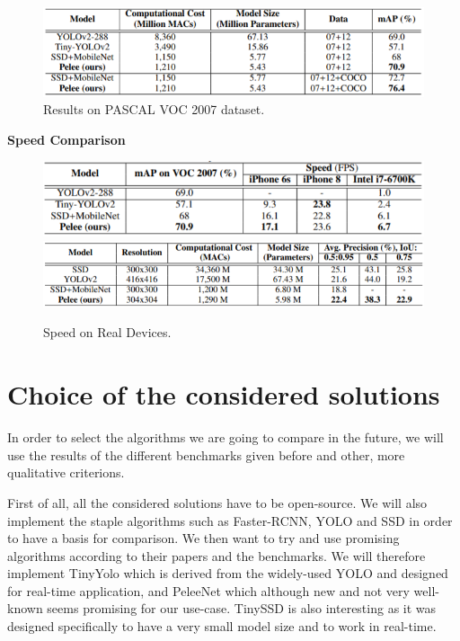 \documentclass[10pt]{article}
\begin{document}
\begin{figure}[H]
  	\centering
    \includegraphics[scale=0.8]{Pelee4.PNG}
    \caption{Results on PASCAL VOC 2007 dataset.}
\end{figure}

\textbf{Speed Comparison}\\
\begin{figure}[H]
  	\centering
    \includegraphics[scale=0.9]{Pelee5.PNG}
    \includegraphics[scale=0.9]{Pelee6.PNG}
    \caption{Speed on Real Devices.}
\end{figure}


\newpage    
\section{Choice of the considered solutions}

In order to select the algorithms we are going to compare in the future, we will use the results of the different benchmarks given before and other, more qualitative criterions.

First of all, all the considered solutions have to be open-source. We will also implement the staple algorithms such as Faster-RCNN, YOLO and SSD in order to have a basis for comparison. We then want to try and use promising algorithms according to their papers and the benchmarks. We will therefore implement TinyYolo which is derived from the widely-used YOLO and designed for real-time application, and PeleeNet which although new and not very well-known seems promising for our use-case. TinySSD is also interesting as it was designed specifically to have a very small model size and to work in real-time.
\end{document}
